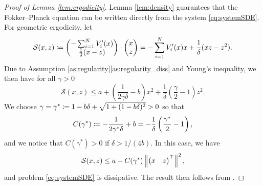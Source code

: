 \documentclass[10pt]{article}
\begin{document}
\begin{appendices}
\begin{proof}[Proof of Lemma \ref{lem:ergodicity}] Lemma \ref{lem:density} guarantees that the Fokker--Planck equation can be written directly from the system \eqref{eq:systemSDE}. For geometric ergodicity, let 
	\begin{equation}
	\mathcal S(x,z) \coloneqq \begin{pmatrix} -\sum_{i=1}^N V_i'(x) \\ \frac1\delta (x - z) \end{pmatrix} \cdot \begin{pmatrix} x \\ z \end{pmatrix} = -\sum_{i=1}^N V_i'(x)x+\frac1\delta(xz-z^2).
	\end{equation}
	Due to Assumption \ref{as:regularity}\ref{as:regularity_diss} and Young's inequality, we then have for all $\gamma > 0$
	\begin{equation}
	\mathcal S(x,z) \leq a + \left(\frac{1}{2\gamma\delta} - b\right)x^2 + \frac1\delta\left(\frac{\gamma}{2} - 1\right)z^2.
	\end{equation}
	We choose $\gamma = \gamma^* \coloneqq 1 - b\delta + \sqrt{1 + (1 - b\delta)^2} > 0$ so that
	\begin{equation}
	C(\gamma^*) \coloneqq -\frac{1}{2\gamma^*\delta} + b = -\frac1\delta\left(\frac{\gamma^*}{2} - 1\right),
	\end{equation}
	and we notice that $C(\gamma^*) > 0$ if $\delta > 1/(4b)$. In this case, we have
	\begin{equation}
	\mathcal S(x, z) \leq a - C(\gamma^*) \left\|\begin{pmatrix} x & z \end{pmatrix}^\top\right\|^2,
	\end{equation}
	and problem \eqref{eq:systemSDE} is dissipative. The result then follows from \cite[Theorem 4.4]{MSH02}.
\end{proof}


\end{appendices}
\end{document}
